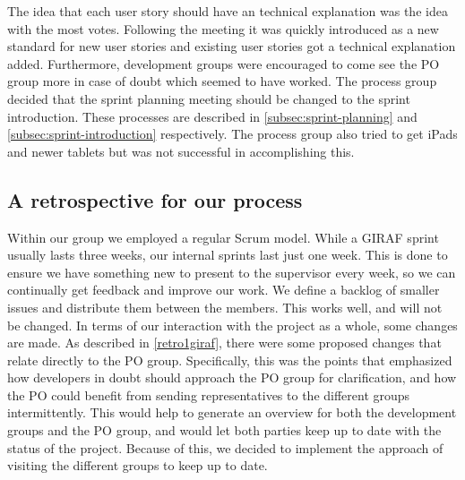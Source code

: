 The idea that each user story should have an technical explanation was the idea with the most votes. 
Following the meeting it was quickly introduced as a new standard for new user stories and existing user stories got a technical explanation added.
Furthermore, development groups were encouraged to come see the PO group more in case of doubt which seemed to have worked.
The process group decided that the sprint planning meeting should be changed to the sprint introduction.
These processes are described in \autoref{subsec:sprint-planning} and \autoref{subsec:sprint-introduction} respectively.
The process group also tried to get iPads and newer tablets but was not successful in accomplishing this.

\subsection{A retrospective for our process}
Within our group we employed a regular Scrum model.
While a GIRAF sprint usually lasts three weeks, our internal sprints last just one week.
This is done to ensure we have something new to present to the supervisor every week, so we can continually get feedback and improve our work.
We define a backlog of smaller issues and distribute them between the members.
This works well, and will not be changed.
In terms of our interaction with the project as a whole, some changes are made.
As described in \autoref{retro1giraf}, there were some proposed changes that relate directly to the PO group.
Specifically, this was the points that emphasized how developers in doubt should approach the PO group for clarification, and how the PO could benefit from sending representatives to the different groups intermittently. 
This would help to generate an overview for both the development groups and the PO group, and would let both parties keep up to date with the status of the project.
Because of this, we decided to implement the approach of visiting the different groups to keep up to date.